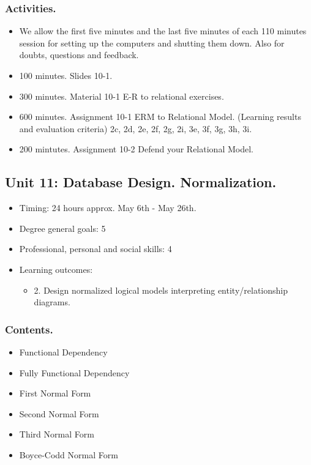 \documentclass[catalan, a4paper, 12pt, titlepage]{article}
\begin{document}
  \subsubsection{Activities.}
  \begin{itemize}
          \item We allow the first five minutes and the last five minutes of each 110 minutes session for setting up the computers and shutting them down. Also for doubts, questions and feedback.
	  \item 100 minutes. Slides 10-1.
	  \item 300 minutes. Material 10-1 E-R to relational exercises.
	  \item 600 minutes. Assignment 10-1 ERM to Relational Model. (\faGraduationCap Learning results and evaluation criteria) 2c, 2d, 2e, 2f, 2g, 2i, 3e, 3f, 3g, 3h, 3i.
	  \item 200 mintutes. Assignment 10-2 Defend your Relational Model.
  \end{itemize}

  \subsection{Unit 11: Database Design. Normalization.}

  \begin{itemize}
	\item Timing: 24 hours approx. May 6th - May 26th.
	\item Degree general goals: 5
	\item Professional, personal and social skills: 4
	\item Learning outcomes: 
		\begin{itemize}
			\item 2. Design normalized logical models interpreting entity/relationship diagrams.
		\end{itemize}
  \end{itemize}

  \subsubsection{Contents.}
  \begin{itemize}
	\item Functional Dependency
	\item Fully Functional Dependency
	\item First Normal Form
	\item Second Normal Form
	\item Third Normal Form
	\item Boyce-Codd Normal Form
  \end{itemize}
\end{document}
